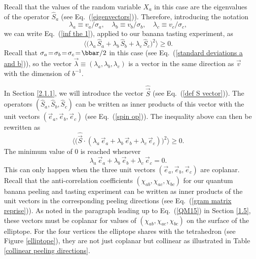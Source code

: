 Recall that the values of the random variable $X_a$ in this case are the eigenvalues of the operator $\hat{S}_a$ (see Eq.\ (\ref{eigenvectors})). Therefore, introducing the notation
\begin{equation}
\lambda_a \equiv v_a/\sigma_a, \quad \lambda_b \equiv v_b/\sigma_b, \quad \lambda_c \equiv v_c/\sigma_c,
\label{lambda=v/sigma}
\end{equation}
we can write Eq.\ (\ref{inf the 1}), applied to our banana tasting experiment, as  
\begin{equation}
\big\langle \big( \lambda_a \, \hat{S}_a + \lambda_b \, \hat{S}_b + \lambda_c \, \hat{S}_c \big)^{\!2} \big\rangle \ge 0.
\label{exp sum S}
\end{equation}
Recall that $\sigma_a \! = \! \sigma_b \! = \! \sigma_c \! = \! \bbar/2$ in this case (see Eq.\ (\ref{standard deviations a and b})), so the vector $\vec{\lambda} \equiv (\lambda_a, \lambda_b, \lambda_c)$ is a vector in the same direction as $\vec{v}$ with the dimension of  $b^{-1}$. 

In Section \ref{2.1.1}, we will introduce the vector $\hat{\vec{S}}$ (see Eq.\ (\ref{def S vector})). The operators $(\hat{S}_a, \hat{S}_b, \hat{S}_c)$ can be written as inner products of this vector with the unit vectors $(\vec{e}_a, \vec{e}_b, \vec{e}_c)$ (see Eq.\ (\ref{spin op})). The inequality above can then be rewritten as
 \begin{equation}
\big\langle \big( \hat{\vec{S}} \! \cdot \! \left( \lambda_a \, \vec{e}_a + \lambda_b \, \vec{e}_b + \lambda_c \, \vec{e}_c \right) \! \big)^{\!2} \big\rangle \ge 0.
\label{exp sum S inner prod}
\end{equation}
The minimum value of 0 is reached whenever 
\begin{equation}
\lambda_a \, \vec{e}_a + \lambda_b \, \vec{e}_b + \lambda_c \, \vec{e}_c = 0.
\label{vecs add to 0}
\end{equation}
This can only happen when the three unit vectors $(\vec{e}_a, \vec{e}_b, \vec{e}_c)$ are coplanar. Recall that the anti-correlation coefficients $(\chi_{ab}, \chi_{ac}, \chi_{bc})$ for our quantum banana peeling and tasting experiment can be written as inner products of the unit vectors in the corresponding peeling directions (see Eq.\ (\ref{gram matrix reprise})). As noted in the paragraph leading up to Eq.\ (\ref{QM15}) in Section \ref{1.5}, these vectors must be coplanar for values of $(\chi_{ab}, \chi_{ac}, \chi_{bc})$ on the surface of the elliptope. For the four vertices the elliptope shares with the tetrahedron (see Figure \ref{elliptope}), they are not just coplanar but collinear as illustrated in Table \ref{collinear peeling directions}.

